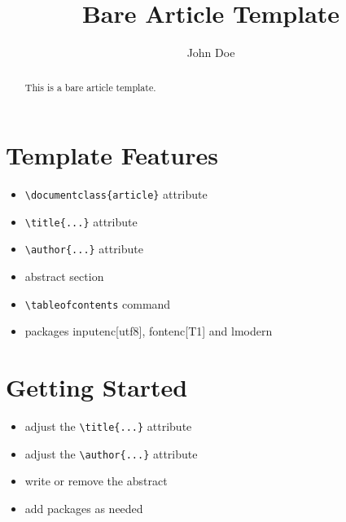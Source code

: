 \documentclass[12pt]{article}
\title{Bare Article Template}
\author{John Doe}
\begin{document}
\maketitle

\begin{abstract}
This is a bare
article
template.
\end{abstract}

\tableofcontents

\section{Template Features}

\begin{itemize}
\item \verb|\documentclass{article}| attribute
\item \verb|\title{...}| attribute
\item \verb|\author{...}| attribute
\item abstract section
\item \verb|\tableofcontents| command
\item packages inputenc[utf8], fontenc[T1] and lmodern
\end{itemize}

\section{Getting Started}

\begin{itemize}
\item adjust the \verb|\title{...}| attribute
\item adjust the \verb|\author{...}| attribute
\item write or remove the abstract
\item add packages as needed
\end{itemize}
\end{document}
